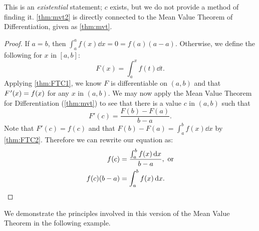 This is an \emph{existential} statement; $c$ exists, but we do not provide a method of finding it. \autoref{thm:mvt2} is directly connected to the Mean Value Theorem of Differentiation, given %
as \autoref{thm:mvt}. %

\begin{proof}
If $a=b$, then $\int_a^a f(x)\dd x =0=f(a)(a-a)$. Otherwise, we define the following for $x$ in $[a,b]$:
\[ F(x)=\int_a^x f(t)\dd t.\]
Applying \autoref{thm:FTC1}, we know $F$ is differentiable on $(a,b)$ and that $\Fp(x)=f(x)$ for any $x$ in $(a,b)$. We may now apply the Mean Value Theorem for Differentiation (\autoref{thm:mvt}) to see that there is a value $c$ in $(a,b)$ such that
\[F'(c)=\frac{F(b)-F(a)}{b-a}.\]
Note that $F'(c)=f(c)$ and that $F(b)-F(a)=\int_a^b f(x)\dd x$ by \autoref{thm:FTC2}. Therefore we can rewrite our equation as: 
\begin{align*}
f(c)&=\frac{\int_a^b f(x)\operatorname{d}\! x}{b-a},\text{ or}\\
f(c)(b-a)&=\int_a^b f(x)\operatorname{d}\! x.\qedhere
\end{align*}
\end{proof}

We demonstrate the principles involved in this version of the Mean Value Theorem in the following example.


